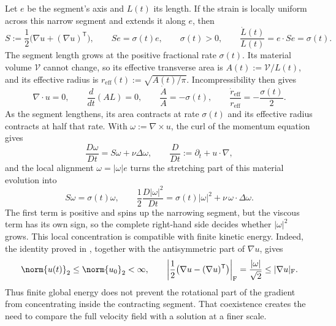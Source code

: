 Let \(e\) be the segment's axis and \(L(t)\) its length. If the strain is locally uniform across this narrow segment and extends it along \(e\), then
\[
  S:=\frac12\bigl(\nabla u+(\nabla u)^{\mathsf T}\bigr),
  \qquad
  Se=\sigma(t)e,
  \qquad
  \sigma(t)>0,
  \qquad
  \frac{\dot L(t)}{L(t)}
  =
  e\cdot Se
  =
  \sigma(t).
\]
The segment length grows at the positive fractional rate \(\sigma(t)\). Its material volume \(\mathcal V\) cannot change, so its effective transverse area is \(A(t):=\mathcal V/L(t)\), and its effective radius is \(r_{\mathrm{eff}}(t):=\sqrt{A(t)/\pi}\). Incompressibility then gives
\[
  \nabla\cdot u=0,
  \qquad
  \frac{d}{dt}(A L)=0,
  \qquad
  \frac{\dot A}{A}=-\sigma(t),
  \qquad
  \frac{\dot r_{\mathrm{eff}}}{r_{\mathrm{eff}}}
  =
  -\frac{\sigma(t)}{2}.
\]
As the segment lengthens, its area contracts at rate \(\sigma(t)\) and its effective radius contracts at half that rate. With \(\omega:=\nabla\times u\), the curl of the momentum equation gives
\[
  \frac{D\omega}{Dt}
  =
  S\omega+\nu\Delta\omega,
  \qquad
  \frac{D}{Dt}
  :=
  \partial_t+u\cdot\nabla,
\]
and the local alignment \(\omega=|\omega|e\) turns the stretching part of this material evolution into
\[
  S\omega
  =
  \sigma(t)\omega,
  \qquad
  \frac12\frac{D|\omega|^2}{Dt}
  =
  \sigma(t)|\omega|^2
  +
  \nu\,\omega\cdot\Delta\omega.
\]
The first term is positive and spins up the narrowing segment, but the viscous term has its own sign, so the complete right-hand side decides whether \(|\omega|^2\) grows. This local concentration is compatible with finite kinetic energy. Indeed, the identity proved in , together with the antisymmetric part of \(\nabla u\), gives
\[
  \norm{u(t)}_2
  \leq
  \norm{u_0}_2
  <\infty,
  \qquad
  \left|\frac12\bigl(\nabla u-(\nabla u)^{\mathsf T}\bigr)\right|_{\mathrm F}
  =
  \frac{|\omega|}{\sqrt2}
  \leq
  |\nabla u|_{\mathrm F}.
\]
Thus finite global energy does not prevent the rotational part of the gradient from concentrating inside the contracting segment. That coexistence creates the need to compare the full velocity field with a solution at a finer scale.



